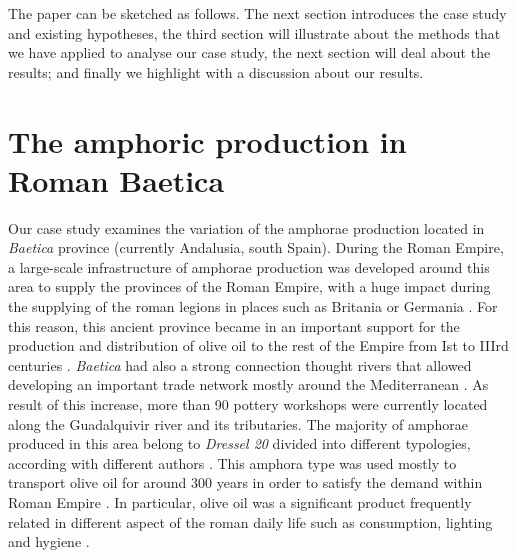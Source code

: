 \documentclass[review]{elsarticle}
\begin{document}
The paper can be sketched as follows. The next section introduces the case study and existing hypotheses, the third section will illustrate about the methods that we have applied to analyse our case study, the next section will deal about the results; and finally we highlight with a discussion about our results.  


\section{The amphoric production in Roman Baetica}

Our case study examines the variation of the amphorae production located in \emph{Baetica} province (currently Andalusia, south Spain). During the Roman Empire, a large-scale infrastructure of amphorae production was developed around this area to supply the provinces of the Roman Empire, with a huge impact during the supplying of the roman legions in places such as Britania \citep{funari_economic_2005, monfort_britannia_1998} or Germania \citep{remesal_annona_1986}. For this reason, this ancient province became in an important support for the production and distribution of olive oil to the rest of the Empire from Ist to IIIrd centuries \cite{chic_comercio_2005,millet_anforas_1998, rodriguez_baetican_1998}. \emph{Baetica} had also a strong connection thought rivers that allowed developing an important trade network mostly around the Mediterranean \citep{garcia_vargas_enrique_formal_2010}. As result of this increase, more than 90 pottery workshops were currently located along the Guadalquivir river and its tributaries. The majority of amphorae produced in this area belong to \emph{Dressel 20} divided into different typologies, according with different authors \citep{berni_millet_epigrafianforica_2008, martin-kilcher_romischen_1994}. This amphora type was used mostly to transport olive oil for around 300 years in order to satisfy the demand within Roman Empire \citep{rodriguez_economioleicola_1977}. In particular, olive oil was a significant product frequently related in different aspect of the roman daily life such as consumption, lighting and hygiene \citep{mattingly_d.j._oil_1988}. 
\end{document}
